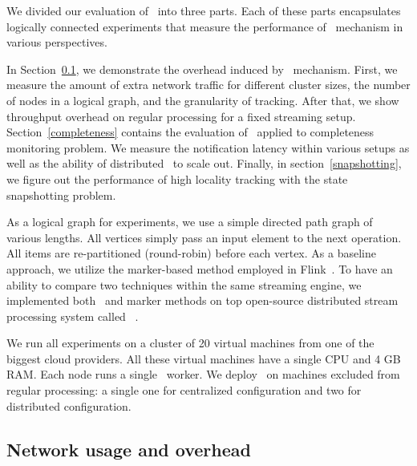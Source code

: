 \label {fs-acker-experiments}

We divided our evaluation of \tracker\ into three parts. Each of these parts encapsulates logically connected experiments that measure the performance of \tracker\ mechanism in various perspectives.

In Section~\ref{overhead}, we demonstrate the overhead induced by \tracker\ mechanism. First, we measure the amount of extra network traffic for different cluster sizes, the number of nodes in a logical graph, and the granularity of tracking. After that, we show throughput overhead on regular processing for a fixed streaming setup. Section~\ref{completeness} contains the evaluation of \tracker\ applied to completeness monitoring problem. We measure the notification latency within various setups as well as the ability of distributed \tracker\ to scale out. Finally, in section~\ref{snapshotting}, we figure out the performance of high locality tracking with the state snapshotting problem. 

As a logical graph for experiments, we use a simple directed path graph of various lengths. All vertices simply pass an input element to the next operation. All items are re-partitioned (round-robin) before each vertex. As a baseline approach, we utilize the marker-based method employed in Flink~\cite{Carbone:2017:SMA:3137765.3137777}. To have an ability to compare two techniques within the same streaming engine, we implemented both \tracker\ and marker methods on top open-source distributed stream processing system called \FlameStream\ .


We run all experiments on a cluster of 20 virtual machines from one of the biggest cloud providers. All these virtual machines have a single CPU and 4 GB RAM. Each node runs a single \FlameStream\ worker.
We deploy \tracker\ on machines excluded from regular processing: a single one for centralized configuration and two for distributed configuration.

\subsection{Network usage and overhead} \label{overhead}

